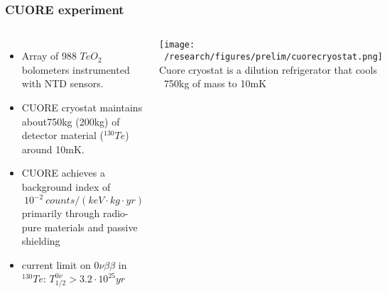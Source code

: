 \documentclass{beamer}
\begin{document}
	\begin{frame}
		\frametitle{CUORE experiment}
		\begin{columns}[c] %
			
			\begin{itemize}
			\item Array of 988 $TeO_2$ bolometers instrumented with NTD sensors.
			\item CUORE	cryostat maintains about750kg (200kg) of detector material ($^{130}Te$) around 10mK.
			\item CUORE achieves a background index of $~ 10^{-2} \  counts/(keV\cdot kg \cdot yr)$ primarily through radio-pure materials and passive shielding
			\item current limit on $0\nu\beta\beta$ in $^{130}Te$: $T_{1/2}^{0\nu} > 3.2\cdot 10^{25}yr$ 
			\end{itemize}			 
			
		
			\texttt{[image: ~/research/figures/prelim/cuorecryostat.png]}
			{\footnotesize Cuore cryostat is a dilution refrigerator that cools ~750kg of mass to 10mK }
			
		\end{columns}
	\end{frame}
	
%			
%			
%		
%			
	
\end{document}
